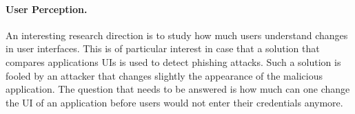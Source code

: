 \paragraph{User Perception.}
An interesting research direction is to study how much users understand changes in user interfaces. This is of particular interest in case that a solution that compares applications UIs is used to detect phishing attacks. Such a solution is fooled by an attacker that changes slightly the appearance of the malicious application. The question that needs to be answered is how much can one change the UI of an application before users would not enter their credentials anymore.